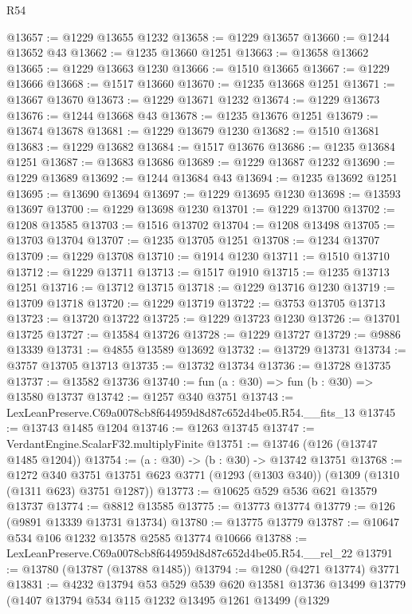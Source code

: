 \begin{lexlean}{R54}
\begin{coremodule}
@13657 := @1229 @13655 @1232
@13658 := @1229 @13657
@13660 := @1244 @13652 @43
@13662 := @1235 @13660 @1251
@13663 := @13658 @13662
@13665 := @1229 @13663 @1230
@13666 := @1510 @13665
@13667 := @1229 @13666
@13668 := @1517 @13660
@13670 := @1235 @13668 @1251
@13671 := @13667 @13670
@13673 := @1229 @13671 @1232
@13674 := @1229 @13673
@13676 := @1244 @13668 @43
@13678 := @1235 @13676 @1251
@13679 := @13674 @13678
@13681 := @1229 @13679 @1230
@13682 := @1510 @13681
@13683 := @1229 @13682
@13684 := @1517 @13676
@13686 := @1235 @13684 @1251
@13687 := @13683 @13686
@13689 := @1229 @13687 @1232
@13690 := @1229 @13689
@13692 := @1244 @13684 @43
@13694 := @1235 @13692 @1251
@13695 := @13690 @13694
@13697 := @1229 @13695 @1230
@13698 := @13593 @13697
@13700 := @1229 @13698 @1230
@13701 := @1229 @13700
@13702 := @1208 @13585
@13703 := @1516 @13702
@13704 := @1208 @13498
@13705 := @13703 @13704
@13707 := @1235 @13705 @1251
@13708 := @1234 @13707
@13709 := @1229 @13708
@13710 := @1914 @1230
@13711 := @1510 @13710
@13712 := @1229 @13711
@13713 := @1517 @1910
@13715 := @1235 @13713 @1251
@13716 := @13712 @13715
@13718 := @1229 @13716 @1230
@13719 := @13709 @13718
@13720 := @1229 @13719
@13722 := @3753 @13705 @13713
@13723 := @13720 @13722
@13725 := @1229 @13723 @1230
@13726 := @13701 @13725
@13727 := @13584 @13726
@13728 := @1229 @13727
@13729 := @9886 @13339
@13731 := @4855 @13589 @13692
@13732 := @13729 @13731
@13734 := @3757 @13705 @13713
@13735 := @13732 @13734
@13736 := @13728 @13735
@13737 := @13582 @13736
@13740 := fun (a : @30) => fun (b : @30) => @13580 @13737
@13742 := @1257 @340 @3751
@13743 := LexLeanPreserve.C69a0078cb8f644959d8d87c652d4be05.R54.__fits_13
@13745 := @13743 @1485 @1204
@13746 := @1263 @13745
@13747 := VerdantEngine.ScalarF32.multiplyFinite
@13751 := @13746 (@126 (@13747 @1485 @1204))
@13754 := (a : @30) -> (b : @30) -> @13742 @13751
@13768 := @1272
    @340
    @3751
    @13751
    @623
    @3771
    (@1293 (@1303 @340))
    (@1309 (@1310 (@1311 @623) @3751 @1287))
@13773 := @10625 @529 @536 @621 @13579 @13737
@13774 := @8812 @13585
@13775 := @13773 @13774
@13779 := @126 (@9891 @13339 @13731 @13734)
@13780 := @13775 @13779
@13787 := @10647 @534 @106 @1232 @13578 @2585 @13774 @10666
@13788 := LexLeanPreserve.C69a0078cb8f644959d8d87c652d4be05.R54.__rel_22
@13791 := @13780 (@13787 (@13788 @1485))
@13794 := @1280 (@4271 @13774) @3771
@13831 := @4232
    @13794
    @53
    @529
    @539
    @620
    @13581
    @13736
    @13499
    @13779
    (@1407
      @13794
      @534
      @115
      @1232
      @13495
      @1261
      @13499
      (@1329

\end{coremodule}
\end{lexlean}

